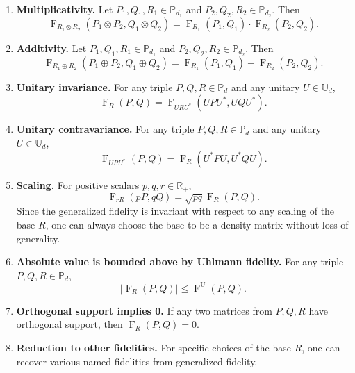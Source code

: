 \documentclass[12pt]{article}
\theoremstyle{definition}
\newcommand{\Fg}[3]{\operatorname{F}_{#3}\!\left(#1, #2\right)}
\newcommand{\Fu}[2]{\operatorname{F}^\mathrm{U}\!\left(#1, #2\right)}
\begin{document}
\begin{enumerate}
    \item \textbf{Multiplicativity.} Let $P_1, Q_1, R_1 \in \mathbb{P}_{d_1}$ and $P_2, Q_2, R_2 \in \mathbb{P}_{d_2}$. Then
    \begin{equation}
    \Fg{P_1 \otimes P_2}{Q_1 \otimes Q_2}{R_1 \otimes R_2} = \Fg{P_1}{Q_1}{R_1} \cdot \Fg{P_2}{Q_2}{R_2}.
    \end{equation}
    \item \textbf{Additivity.} Let $P_1, Q_1, R_1 \in \mathbb{P}_{d_1}$ and $P_2, Q_2, R_2 \in \mathbb{P}_{d_2}$. Then
    \begin{equation}
    \Fg{P_1 \oplus P_2}{Q_1 \oplus Q_2}{R_1 \oplus R_2} = \Fg{P_1}{Q_1}{R_1} + \Fg{P_2}{Q_2}{R_2}.
    \end{equation}
    \item \textbf{Unitary invariance.} For any triple $P, Q, R \in \mathbb{P}_d$ and any unitary $U \in \mathbb{U}_d$,
    \begin{equation}
        \operatorname{F}_R(P, Q) = \Fg{U P U^*}{U Q U^*}{U R U^*}.
    \end{equation}
    \item \textbf{Unitary contravariance.} For any triple $P, Q, R \in \mathbb P_d $ and any unitary $U \in \mathbb U_d$,
    \begin{equation}
        \operatorname{F}_{U R U^*}(P, Q) = \Fg{U^* P U}{U^* Q U}{R}.
    \end{equation}
    \item \textbf{Scaling.} For positive scalars $p, q, r \in \mathbb{R}_+$,
    \begin{equation}
    \Fg{p P}{q Q}{r R} = \sqrt{p q} \operatorname{F}_R(P, Q).
    \end{equation}
    Since the generalized fidelity is invariant with respect to any scaling of the base $R$, one can always choose the base to be a density matrix without loss of generality.
    \item \textbf{Absolute value is bounded above by Uhlmann fidelity.} For any triple $P, Q, R \in \mathbb{P}_d$,
    \begin{equation}
    |\operatorname{F}_R(P, Q)| \leq \Fu{P}{Q}.
    \end{equation}
    \item \textbf{Orthogonal support implies 0.} If any two matrices from $P,Q,R$ have orthogonal support, then $\operatorname{F}_R(P,Q) =0.$
    \item \textbf{Reduction to other fidelities.} For specific choices of the base $R$, one can recover various named fidelities from generalized fidelity.

\end{enumerate}
\end{document}
